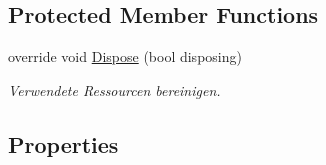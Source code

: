 \subsection*{Protected Member Functions}
\begin{DoxyCompactItemize}
\item 
override void \hyperlink{class_a_rdev_kit_1_1_editor_window_a42208cca445e8fc2eb18e829b5c67d37}{Dispose} (bool disposing)
\begin{DoxyCompactList}\small\item\em Verwendete Ressourcen bereinigen. \end{DoxyCompactList}\end{DoxyCompactItemize}
\subsection*{Properties}
